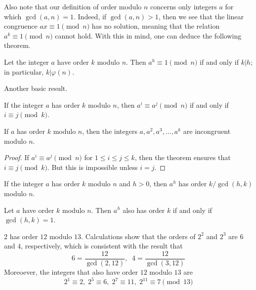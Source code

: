\documentclass{article}
\newcounter{theorem}[section]
\newcounter{definition}[section]
\newcounter{example}[section]
\begin{document}
Also note that our definition of order modulo $n$ concerns only integers $a$ for which $\gcd(a, n) = 1$. Indeed, if $\gcd(a, n) >1$, then we see that the linear congruence $ax \equiv 1 \pmod{n}$ has no solution, meaning that the relation $a^k \equiv 1 \pmod{n}$ cannot hold. With this in mind, one can deduce the following theorem. 

\begin{theorem}
  \label{thm:exponents-annihilating-a-are-multiples-of-its}
Let the integer $a$ have order $k$ modulo $n$. Then $a^h \equiv 1 \pmod{n}$ if and only if $k|h$; in particular, $k|\varphi(n)$. 
\end{theorem}

Another basic result. 

\begin{theorem}
  \label{thm:congruent-powers-have-congruent-exponents}
If the integer $a$ has order $k$ modulo $n$, then $a^i \equiv a^j \pmod{n}$ if and only if $i \equiv j \pmod{k}$. 
\end{theorem}

\begin{corollary}
  \label{thm:first-k-powers-are-pairwise-incongruent}
If $a$ has order $k$ modulo $n$, then the integers $a, a^2, a^3, ..., a^k$ are incongruent modulo $n$. 
\end{corollary}
\begin{proof}
If $a^i \equiv a^j \pmod{n}$ for $1 \leq i \leq j \leq k$, then the theorem ensures that $i \equiv j \pmod{k}$. But this is impossible unless $i = j$. 
\end{proof}

\begin{theorem}
  \label{thm:order-of-a-power}
If the integer $a$ has order $k$ modulo $n$ and $h>0$, then $a^h$ has order $k/\gcd(h, k)$ modulo $n$. 
\end{theorem}

\begin{corollary}
  \label{thm:when-a-power-retains-the-full-order}
Let $a$ have order $k$ modulo $n$. Then $a^h$ also has order $k$ if and only if $\gcd(h, k) = 1$. 
\end{corollary}

\begin{example}
  \label{ex:orders-of-powers-of-2-modulo-13}
$2$ has order $12$ modulo $13$. Calculations show that the orders of $2^2$ and $2^3$ are $6$ and $4$, respectively, which is consistent with the result that
\begin{equation}
  6 = \frac{12}{\gcd(2, 12)}, \;\; 4 = \frac{12}{\gcd(3, 12)}
\end{equation}
Moreoever, the integers that also have order $12$ modulo $13$ are 
\begin{equation}
  2^1 \equiv 2, \; 2^5 \equiv 6, \; 2^7 \equiv 11, \; 2^{11} \equiv 7 \pmod{13}
\end{equation}
\end{example}
\end{document}
